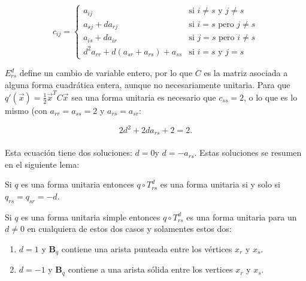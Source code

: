 \begin{equation}
c_{ij} = \left \{ 
    \begin{matrix} 
    a_{ij} & \mbox{si } i \neq s \mbox{ y } j \neq s\\
    a_{sj} + da_{rj} & \mbox{si } i = s \mbox{ pero } j \neq s\\ 
    a_{is} + da_{ir} & \mbox{si } j = s \mbox{ pero } i \neq s\\
    d^{2}a_{rr} + d(a_{sr} + a_{rs}) + a_{ss} & \mbox{si } i = s \mbox{ y } j = s
    \end{matrix}\right.
    \label{ecuacion:2.1}
\end{equation}

$E_{rs}^{d}$ define un cambio de variable entero, por lo que $C$ es la matriz asociada a alguna forma cuadrática entera, aunque no necesariamente unitaria. Para que $q'(\overrightarrow{x}) = \frac{1}{2}\overrightarrow{x}^{T}C\overrightarrow{x}$ sea una forma unitaria es necesario que $c_{ss} = 2$, o lo que es lo mismo (con $a_{rr} = a_{ss} = 2$ y $a_{rs} = a_{sr}$:

\begin{equation*}
    2d^{2} + 2da_{rs} + 2 = 2.
\end{equation*}

\paragraph{}
Esta ecuación tiene dos soluciones: $d = 0$y $d = -a_{rs}$. Estas soluciones se resumen en el siguiente lema:

\begin{lemma}
Si $q$ es una forma unitaria entonces $q \circ T_{rs}^{d}$ es una forma unitaria si y solo si $q_{rs} = q_{sr} = -d$.
\label{lema:2.1}
\end{lemma}

\begin{corollary}
Si $q$ es una forma unitaria simple entonces $q \circ T_{rs}^{d}$ es una forma unitaria para un $d \neq 0$ en cualquiera de estos dos casos y solamentes estos dos:
\label{corolario:2.2}
\end{corollary}

\begin{enumerate}
    \item $d = 1$ y $\textbf{B}_{q}$ contiene una arista punteada entre los vértices $x_{r}$ y $x_{s}$.
    \item $d = -1$ y $\textbf{B}_{q}$ contiene a una arista sólida entre los vertices $x_{r}$ y $x_{s}$.
\end{enumerate}

